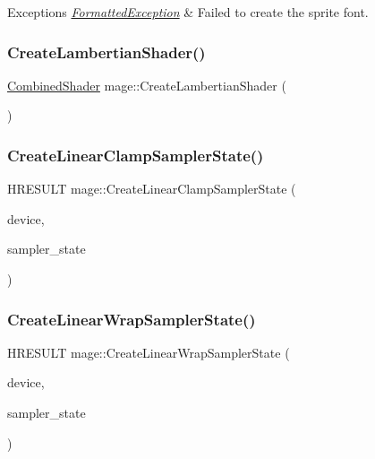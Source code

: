 \begin{DoxyExceptions}{Exceptions}
{\em \hyperlink{structmage_1_1_formatted_exception}{Formatted\+Exception}} & Failed to create the sprite font. \\
\hline
\end{DoxyExceptions}
\hypertarget{namespacemage_ab0bd21012fa29244f0f9b3201bebc2a5}{}\label{namespacemage_ab0bd21012fa29244f0f9b3201bebc2a5} 
\subsubsection{\texorpdfstring{Create\+Lambertian\+Shader()}{CreateLambertianShader()}}
{\footnotesize\ttfamily \hyperlink{structmage_1_1_combined_shader}{Combined\+Shader} mage\+::\+Create\+Lambertian\+Shader (\begin{DoxyParamCaption}{ }\end{DoxyParamCaption})}

\hypertarget{namespacemage_aa8f37da8dc3c10b5e4e1cd56be94ff95}{}\label{namespacemage_aa8f37da8dc3c10b5e4e1cd56be94ff95} 
\subsubsection{\texorpdfstring{Create\+Linear\+Clamp\+Sampler\+State()}{CreateLinearClampSamplerState()}}
{\footnotesize\ttfamily H\+R\+E\+S\+U\+LT mage\+::\+Create\+Linear\+Clamp\+Sampler\+State (\begin{DoxyParamCaption}\item[{I\+D3\+D11\+Device2 $\ast$}]{device,  }\item[{I\+D3\+D11\+Sampler\+State $\ast$$\ast$}]{sampler\+\_\+state }\end{DoxyParamCaption})}

\hypertarget{namespacemage_a714981745a2e53e5c55b04c4441bd2d0}{}\label{namespacemage_a714981745a2e53e5c55b04c4441bd2d0} 
\subsubsection{\texorpdfstring{Create\+Linear\+Wrap\+Sampler\+State()}{CreateLinearWrapSamplerState()}}
{\footnotesize\ttfamily H\+R\+E\+S\+U\+LT mage\+::\+Create\+Linear\+Wrap\+Sampler\+State (\begin{DoxyParamCaption}\item[{I\+D3\+D11\+Device2 $\ast$}]{device,  }\item[{I\+D3\+D11\+Sampler\+State $\ast$$\ast$}]{sampler\+\_\+state }\end{DoxyParamCaption})}

